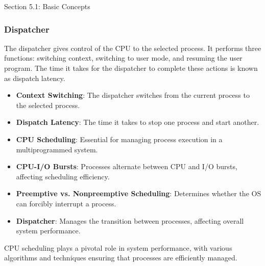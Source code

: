 \begin{notes}{Section 5.1: Basic Concepts}
\begin{highlight}
    \end{highlight}
    
    \subsubsection*{Dispatcher}
    
    The dispatcher gives control of the CPU to the selected process. It performs three functions: switching context, switching to user mode, and resuming the user program. The time it takes for the dispatcher 
    to complete these actions is known as dispatch latency.
    
    \begin{highlight}[Dispatcher]
    
        \begin{itemize}
            \item \textbf{Context Switching}: The dispatcher switches from the current process to the selected process.
            \item \textbf{Dispatch Latency}: The time it takes to stop one process and start another.
        \end{itemize}
    
    \end{highlight}
    
    \begin{highlight}
    
        \begin{itemize}
            \item \textbf{CPU Scheduling}: Essential for managing process execution in a multiprogrammed system.
            \item \textbf{CPU-I/O Bursts}: Processes alternate between CPU and I/O bursts, affecting scheduling efficiency.
            \item \textbf{Preemptive vs. Nonpreemptive Scheduling}: Determines whether the OS can forcibly interrupt a process.
            \item \textbf{Dispatcher}: Manages the transition between processes, affecting overall system performance.
        \end{itemize}
    
    CPU scheduling plays a pivotal role in system performance, with various algorithms and techniques ensuring that processes are efficiently managed.
    
    \end{highlight}
\end{notes}

